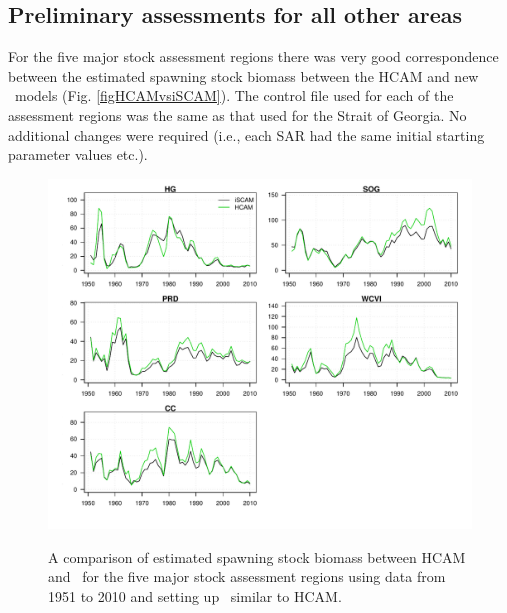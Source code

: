 	
	\subsection{Preliminary assessments for all other areas}
	For the five major stock assessment regions there was very good correspondence between the estimated spawning stock biomass between the HCAM and new \iscam\  models (Fig. \ref{figHCAMvsiSCAM}). The control file used for each of the assessment regions was the same as that used for the Strait of Georgia.  No additional changes were required (i.e., each SAR had the same initial starting parameter values etc.).

\begin{figure}[htbp]
	\centering
		\includegraphics[width=\textwidth]{../Figs/iscam_fig_SBt_iSCAMvsHCAM.pdf}\\
	\caption{A comparison of estimated spawning stock biomass between HCAM and \iscam\ for the five major stock assessment regions using data from 1951 to 2010 and setting up \iscam\ similar to HCAM.}
	\label{fig:iSCAMvsHCAM}
\end{figure}


